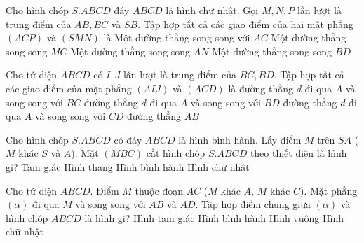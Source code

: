 \begin{ex}%
	Cho hình chóp $S.ABCD$ đáy $ABCD$ là hình chữ nhật. Gọi $M,N,P$ lần lượt là trung điểm của $ AB, BC $ và $ SB $. Tập hợp tất cả các giao điểm của hai mặt phẳng $ (ACP) $ và $ (SMN) $ là
	\choice
	{\True Một đường thẳng song song với $ AC $}
	{ Một đường thẳng song song $ MC $}
	{ Một đường thằng song song $ AN $}
	{ Một đường thẳng song song $ BD $}
\end{ex}
\begin{ex}%
	Cho tứ diện $ABCD$ có $I,J$ lần lượt là trung điểm của $BC,BD$. Tập hợp tất cả các giao điểm của mặt phẳng $(AIJ)$ và $(ACD)$ là
	\choice
	{ đường thẳng $d$ đi qua $A$ và song song với $BC$}
	{ đường thẳng $d$ đi qua $A$ và song song với $BD$}
	{\True đường thẳng $ d$ đi qua $A$ và song song với $CD$}
	{ đường thẳng $AB$}
\end{ex}
\begin{ex}%
	Cho hình chóp $S.ABCD$ có đáy $ABCD$ là hình bình hành. Lấy điểm $M$ trên $SA$ ($M$ khác $S$ và $A$). Mặt $( MBC )$ cắt hình chóp $S.ABCD$ theo thiết diện là hình gì?
	\choice
	{ Tam giác}
	{\True Hình thang}
	{ Hình bình hành}
	{ Hình chữ nhật}
\end{ex}
\begin{ex}%
	Cho tứ diện $ABCD$. Điểm $M$ thuộc đoạn $AC$ ($M$ khác $A$, $M$ khác $C$). Mặt phẳng $(\alpha)$ đi qua $M$ và song song với $AB$ và $AD$. Tập hợp điểm chung giữa $(\alpha)$ và hình chóp $ABCD$ là hình gì?
	\choice
	{\True Hình tam giác}
	{ Hình bình hành}
	{ Hình vuông}
	{ Hình chữ nhật}
\end{ex}
